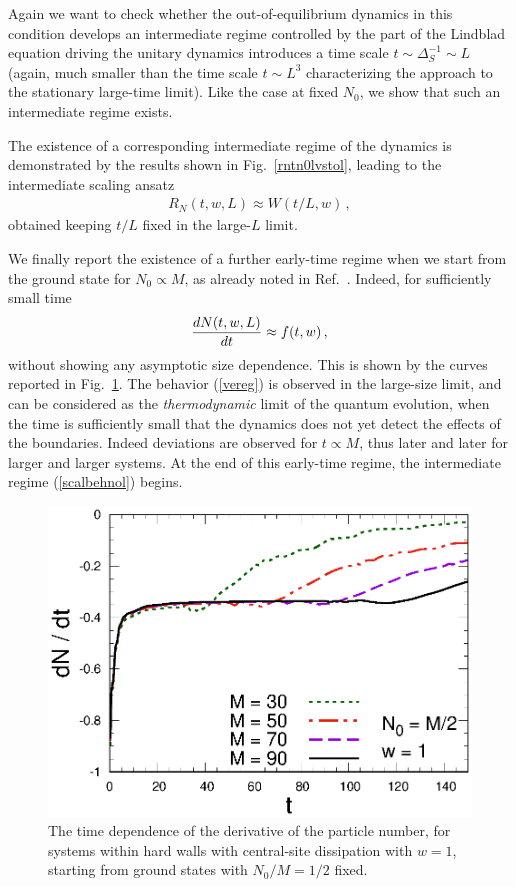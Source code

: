   Again we want to check whether the out-of-equilibrium dynamics in
    this condition develops an intermediate regime controlled by the
    part of the Lindblad equation driving the unitary dynamics
    introduces a time scale $t\sim \Delta_S^{-1}\sim L$ (again, much
    smaller than the time scale $t\sim L^3$ characterizing the approach
    to the stationary large-time limit). Like the case at fixed $N_0$,
    we show that such an intermediate regime exists.
  
  The existence of a corresponding intermediate regime of the dynamics
  is demonstrated by the results shown in Fig.~\ref{rntn0lvstol},
  leading to the intermediate scaling ansatz
  \begin{eqnarray}
   R_N(t,w,L) \approx W(t/L,w)\,,   \label{scalbehnol}
  \end{eqnarray}
  obtained keeping $t/L$ fixed in the large-$L$ limit.  
  
  We finally report the existence of a further early-time regime when we
  start from the ground state for $N_0\propto M$, as already noted in
  Ref.~\cite{FMKCD-20}. Indeed, for sufficiently small time
  \begin{equation}
    {d N(t,w,L)\over dt} \approx  f(t,w)\,,
    \label{vereg}
    \end{equation}
  without showing any asymptotic size dependence.  This is shown by the
  curves reported in Fig.~\ref{rntln0lvst}.  The behavior (\ref{vereg})
  is observed in the large-size limit, and can be considered as the {\em
    thermodynamic} limit of the quantum evolution, when the time is
  sufficiently small that the dynamics does not yet detect the effects
  of the boundaries.  Indeed deviations are observed for $t\propto M$,
  thus later and later for larger and larger systems. At the end of this
  early-time regime, the intermediate regime (\ref{scalbehnol}) begins.
  
  
  
  \begin{figure}[!htb]
\centering
  \includegraphics[width=0.65\columnwidth]{imm/dNLL0.eps}
  \caption{The time dependence of the derivative of the particle number,
    for systems within hard walls with central-site dissipation with
    $w=1$, starting from ground states with $N_0/M=1/2$ fixed.  }
    \label{rntln0lvst}
  \end{figure}
  
